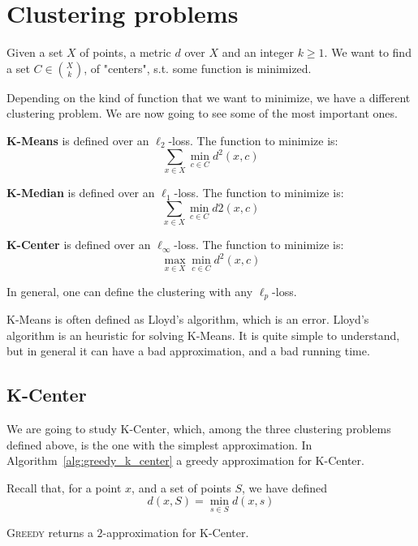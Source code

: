 \section{Clustering problems}

Given a set $X$ of points, a metric $d$ over $X$ and an integer $k \geq 1$.
We want to find a set $C \in \binom{X}{k}$, of "centers", s.t. some function is minimized.

Depending on the kind of function that we want to minimize, we have a different clustering problem.
We are now going to see some of the most important ones.

\textbf{K-Means} is defined over an $\ell_2$-loss. The function to minimize is:
\[ \sum_{x \in X} \min_{c \in C} d^2(x,c) \]

\textbf{K-Median} is defined over an $\ell_1$-loss. The function to minimize is:
\[ \sum_{x \in X} \min_{c \in C} d2(x,c) \]

\textbf{K-Center} is defined over an $\ell_\infty$-loss. The function to minimize is:
\[ \max_{x \in X} \min_{c \in C} d^2(x,c) \]

In general, one can define the clustering with any $\ell_p$-loss.

K-Means is often defined as Lloyd's algorithm, which is an error.
Lloyd's algorithm is an heuristic for solving K-Means. It is quite simple to understand, but in general it can have a bad approximation, and a bad running time.

\subsection{K-Center}
    We are going to study K-Center, which, among the three clustering problems defined above, is the one with the simplest approximation.
    In Algorithm~\ref{alg:greedy_k_center} a greedy approximation for K-Center.

    Recall that, for a point $x$, and a set of points $S$, we have defined
    \[ d(x,S) = \min_{s \in S} d(x,s) \]

    

    \begin{theorem}
        \textsc{Greedy} returns a $2$-approximation for K-Center.
    \end{theorem}

